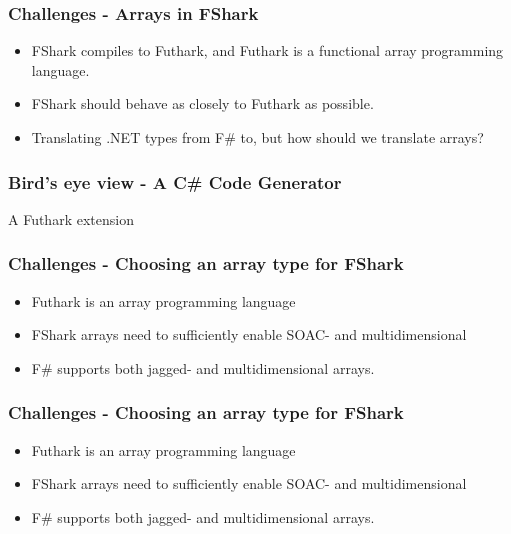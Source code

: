 \documentclass[10pt, compress, usenames, dvipsnames]{beamer}
\begin{document}
\begin{frame}[plain]
\frametitle{Challenges - Arrays in FShark}
\begin{itemize}
\item<1-> FShark compiles to Futhark, and Futhark is a functional array programming
language.
\item<2-> FShark should behave as closely to Futhark as possible.
\item<3-> Translating .NET types from F\# to, but how should we translate arrays?
\end{itemize}

\end{frame}

\begin{frame}[plain]
\frametitle{Bird's eye view - A C\# Code Generator}
\begin{center}
  \Huge A Futhark extension
\end{center}
\end{frame}

\begin{frame}[fragile]
  \frametitle{Challenges - Choosing an array type for FShark}
  \begin{itemize}
  \item <1-> Futhark is an array programming language
  \item <2-> FShark arrays need to sufficiently enable SOAC- and multidimensional
  \item <3-> F\# supports both jagged- and multidimensional arrays.
  \end{itemize}
\end{frame}
\begin{frame}[fragile]
  \frametitle{Challenges - Choosing an array type for FShark}
  \begin{itemize}
  \item <1-> Futhark is an array programming language
  \item <2-> FShark arrays need to sufficiently enable SOAC- and multidimensional
  \item <3-> F\# supports both jagged- and multidimensional arrays.
  \end{itemize}
\end{frame}
\end{document}
